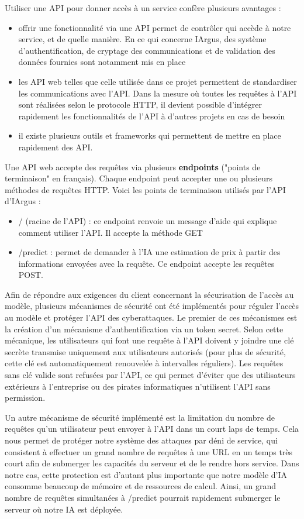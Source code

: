 \documentclass[french]{article}
\begin{document}
    Utiliser une API pour donner accès à un service confère plusieurs avantages :
    \begin{itemize}
        \item offrir une fonctionnalité via une API permet de contrôler qui accède à notre service, et de quelle manière. En ce qui concerne IArgus, des système d'authentification, de cryptage des communications et de validation des données fournies sont notamment mis en place
        \item les API web telles que celle utilisée dans ce projet permettent de standardiser les communications avec l'API. Dans la mesure où toutes les requêtes à l'API sont réalisées selon le protocole HTTP, il devient possible d'intégrer rapidement les fonctionnalités de l'API à d'autres projets en cas de besoin
        \item il existe plusieurs outils et frameworks qui permettent de mettre en place rapidement des API. 
    \end{itemize}
    Une API web accepte des requêtes via plusieurs \textbf{endpoints} ("points de terminaison" en français). Chaque endpoint peut accepter une ou plusieurs méthodes de requêtes HTTP. Voici les points de terminaison utilisés par l'API d'IArgus :
    \begin{itemize}
        \item / (racine de l'API) : ce endpoint renvoie un message d'aide qui explique comment utiliser l'API. Il accepte la méthode GET
        \item /predict : permet de demander à l'IA une estimation de prix à partir des informations envoyées avec la requête. Ce endpoint accepte les requêtes POST.
    \end{itemize}
    Afin de répondre aux exigences du client concernant la sécurisation de l'accès au modèle, plusieurs mécanismes de sécurité ont été implémentés pour réguler l'accès au modèle et protéger l'API des cyberattaques. Le premier de ces mécanismes est la création d'un mécanisme d'authentification via un token secret. Selon cette mécanique, les utilisateurs qui font une requête à l'API doivent y joindre une clé secrète transmise uniquement aux utilisateurs autorisés (pour plus de sécurité, cette clé est automatiquement renouvelée à intervalles réguliers). Les requêtes sans clé valide sont refusées par l'API, ce qui permet d'éviter que des utilisateurs extérieurs à l'entreprise ou des pirates informatiques n'utilisent l'API sans permission.

    Un autre mécanisme de sécurité implémenté est la limitation du nombre de requêtes qu'un utilisateur peut envoyer à l'API dans un court laps de temps. Cela nous permet de protéger notre système des attaques par déni de service, qui consistent à effectuer un grand nombre de requêtes à une URL en un temps très court afin de submerger les capacités du serveur et de le rendre hors service. Dans notre cas, cette protection est d'autant plus importante que notre modèle d'IA consomme beaucoup de mémoire et de ressources de calcul. Ainsi, un grand nombre de requêtes simultanées à /predict pourrait rapidement submerger le serveur où notre IA est déployée.
\end{document}
